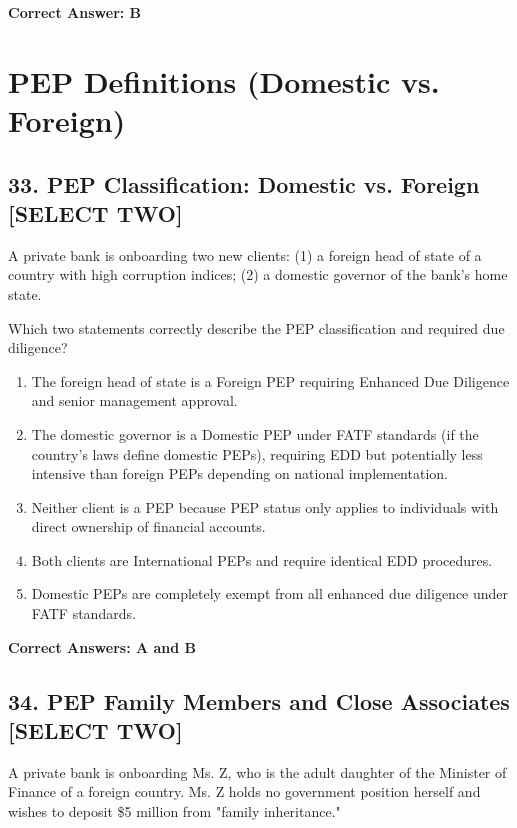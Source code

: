 \documentclass[11pt,a4paper]{article}
\begin{document}
	\textbf{Correct Answer: B}
	
	\section{PEP Definitions (Domestic vs. Foreign)}
	
	\subsection{33. PEP Classification: Domestic vs. Foreign \textnormal{[SELECT TWO]}}
	
	A private bank is onboarding two new clients: (1) a foreign head of state of a country with high corruption indices; (2) a domestic governor of the bank's home state.
	
	Which two statements correctly describe the PEP classification and required due diligence?
	
	\begin{enumerate}[label=\Alph*.]
		\item The foreign head of state is a Foreign PEP requiring Enhanced Due Diligence and senior management approval.
		\item The domestic governor is a Domestic PEP under FATF standards (if the country's laws define domestic PEPs), requiring EDD but potentially less intensive than foreign PEPs depending on national implementation.
		\item Neither client is a PEP because PEP status only applies to individuals with direct ownership of financial accounts.
		\item Both clients are International PEPs and require identical EDD procedures.
		\item Domestic PEPs are completely exempt from all enhanced due diligence under FATF standards.
	\end{enumerate}
	
	\textbf{Correct Answers: A and B}
	
	\subsection{34. PEP Family Members and Close Associates \textnormal{[SELECT TWO]}}
	
	A private bank is onboarding Ms. Z, who is the adult daughter of the Minister of Finance of a foreign country. Ms. Z holds no government position herself and wishes to deposit \$5 million from "family inheritance."
	
\end{document}
